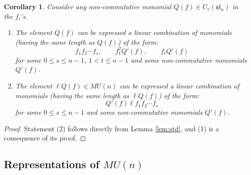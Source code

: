\documentclass{amsart}
\numberwithin{equation}{section}
\theoremstyle{theorem}
\newtheorem{corollary}[theorem]{Corollary}
\theoremstyle{definition}
\newcommand{\sll}{\mathfrak{sl}}
\newcommand{\uvsln}{U_v(\sll_n)}
\begin{document}
\begin{corollary} \label{cor:lastcor}
Consider any non-commutative monomial $Q(f)\in \uvsln$ in the $f_i$'s.
\begin{enumerate}
\item The element $Q(f)$ can be expressed a linear combination of monomials (having the same length as $Q(f)$) of the form:
\[f_1f_2\cdots f_s,\qquad f_1^2 Q'(f), \qquad f_t Q'(f)\]
for some $0\leq s\leq n-1$, $1<t\leq n-1$ and some non-commutative monomials $Q'(f)$.
\item The element $\ell Q(f)\in MU(n)$ can be expressed a linear combination of monomials (having the same length as $\ell Q(f)$) of the form:
\[Q'(f)\ell f_1f_2\cdots f_s\]
for some $0\leq s\leq n-1$ and some non-commutative monomials $Q'(f)$.
\end{enumerate}
\end{corollary}
\begin{proof}
Statement (2) follows directly from Lemma \ref{lem:std}, and (1) is a consequence of its proof.
\end{proof}

\subsection{Representations of $MU(n)$} \label{sec:mirareps}
\end{document}
